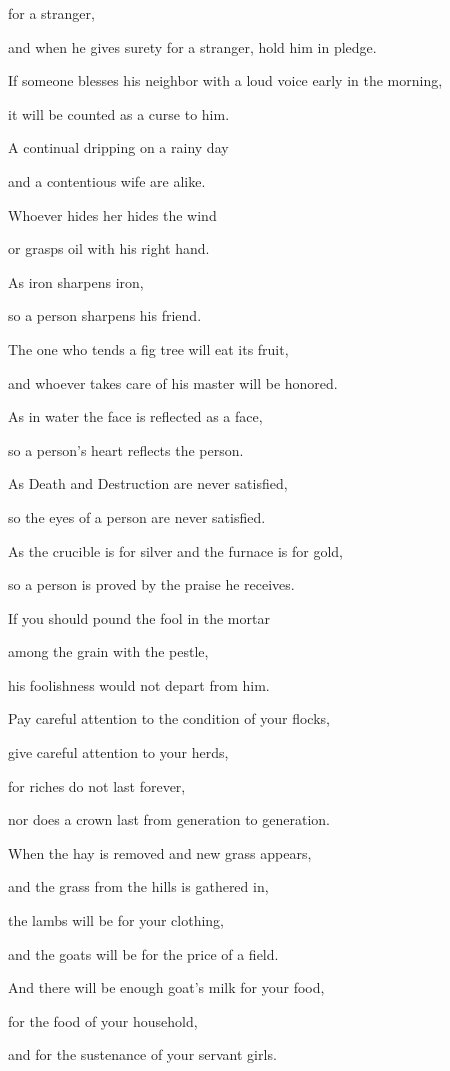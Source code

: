 {for
a stranger,
\par }{\Q and when he gives surety
for a stranger,
hold him in pledge.
\par }{\Q {}If
someone blesses
his neighbor
with a loud
voice
early
in the morning,
\par }{\Q it
will be counted as
a curse to him.
\par }{\Q {}A continual
dripping
on a rainy
day
\par }{\Q and a contentious
wife
are alike.
\par }{\Q {}Whoever hides
her hides
the wind
\par }{\Q or grasps
oil
with his right hand.
\par }{\Q {}As iron
sharpens
iron,
\par }{\Q so a person
sharpens
his friend.
\par }{\Q {}The one who tends
a fig tree
will eat
its fruit,
\par }{\Q and whoever
takes care
of his master
will be honored.
\par }{\Q {}As in water
the face
is reflected as a face,
\par }{\Q so
a person’s
heart
reflects the person.
\par }{\Q {}As Death
and Destruction
are never
satisfied,
\par }{\Q so the eyes
of a person
are never
satisfied.
\par }{\Q {}As the crucible
is for silver
and the furnace
is for gold,
\par }{\Q so a person
is proved by the praise he receives.
\par }{\Q {}If
you should pound
the fool
in the mortar
\par }{\Q among
the grain
with the pestle,
\par }{\Q his foolishness
would not
depart
from him.
\par }{\Q {}Pay careful attention
to the condition
of your flocks,
\par }{\Q give careful
attention
to your herds,
\par }{\Q {}for
riches
do not
last forever,
\par }{\Q nor does
a crown
last from generation
to generation.
\par }{\Q {}When the hay
is removed
and new grass
appears,
\par }{\Q and the grass
from the hills
is gathered in,
\par }{\Q {}the lambs
will be for your clothing,
\par }{\Q and the goats
will be for the price
of a field.
\par }{\Q {}And there will be enough
goat’s
milk
for your food,
\par }{\Q for the food
of your household,
\par }{\Q and for the sustenance
of your servant girls.

}

